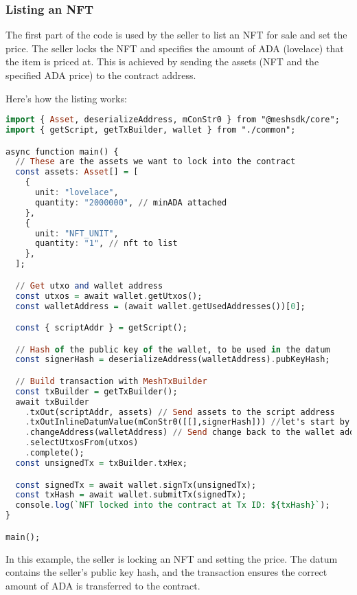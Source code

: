 \subsubsection{Listing an NFT}

The first part of the code is used by the seller to list an NFT for sale and set the price. The seller locks the NFT and specifies the amount of ADA (lovelace) that the item is priced at. This is achieved by sending the assets (NFT and the specified ADA price) to the contract address.

Here’s how the listing works:

\begin{lstlisting}[language=haskell, caption=Listing an NFT using MeshJS]
import { Asset, deserializeAddress, mConStr0 } from "@meshsdk/core";
import { getScript, getTxBuilder, wallet } from "./common";

async function main() {
  // These are the assets we want to lock into the contract
  const assets: Asset[] = [
    {
      unit: "lovelace",
      quantity: "2000000", // minADA attached
    },
    {
      unit: "NFT_UNIT",
      quantity: "1", // nft to list
    },
  ];

  // Get utxo and wallet address
  const utxos = await wallet.getUtxos();
  const walletAddress = (await wallet.getUsedAddresses())[0];

  const { scriptAddr } = getScript();

  // Hash of the public key of the wallet, to be used in the datum
  const signerHash = deserializeAddress(walletAddress).pubKeyHash;

  // Build transaction with MeshTxBuilder
  const txBuilder = getTxBuilder();
  await txBuilder
    .txOut(scriptAddr, assets) // Send assets to the script address
    .txOutInlineDatumValue(mConStr0([[],signerHash])) //let's start by setting only the owner and no payout list
    .changeAddress(walletAddress) // Send change back to the wallet address
    .selectUtxosFrom(utxos)
    .complete();
  const unsignedTx = txBuilder.txHex;

  const signedTx = await wallet.signTx(unsignedTx);
  const txHash = await wallet.submitTx(signedTx);
  console.log(`NFT locked into the contract at Tx ID: ${txHash}`);
}

main();
\end{lstlisting}

In this example, the seller is locking an NFT and setting the price. The datum contains the seller's public key hash, and the transaction ensures the correct amount of ADA is transferred to the contract.

